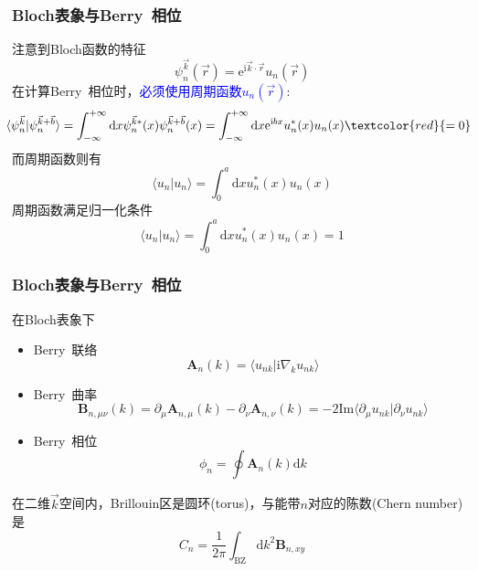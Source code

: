 {\frame
{
	\frametitle{\rm{Bloch}表象与\rm{Berry~}相位}
	注意到\textrm{Bloch}函数的特征
	\begin{displaymath}
		\psi_n^{\vec k}(\vec r)=\mathrm{e}^{\mathrm{i}\vec k\cdot\vec r}u_n(\vec r)
	\end{displaymath}
	在计算\textrm{Berry~}相位时，\textcolor{blue}{必须使用周期函数$u_n(\vec r)$}:
	\begin{displaymath}
		\hspace*{-5pt}
		\langle\psi_n^{\vec k}|\psi_n^{\vec k+\vec b}\rangle=\int_{-\infty}^{+\infty}\mathrm{d}x\psi_n^{\vec k\ast}(x)\psi_n^{\vec k+\vec b}(x)=\int_{-\infty}^{+\infty}\mathrm{d}x\mathrm{e}^{\mathrm{i}bx} u_n^{\ast}(x)u_n(x)\textcolor{red}{=0}
	\end{displaymath}
而周期函数则有
	\begin{displaymath}
		\langle u_n|u_n\rangle=\int_0^a\mathrm{d}x u_n^{\ast}(x)u_n(x)
	\end{displaymath}
周期函数满足归一化条件
	\begin{displaymath}
		\langle u_n|u_n\rangle=\int_0^a\mathrm{d}x u_n^{\ast}(x)u_n(x)=1
	\end{displaymath}
}

\frame
{
	\frametitle{\rm{Bloch}表象与\rm{Berry~}相位}
	在\textrm{Bloch}表象下
	\begin{itemize}
		\item \textrm{Berry~}联络	
	\begin{displaymath}
		\mathbf{A}_n(k)=\langle u_{nk}|\mathrm{i}\nabla_{k}u_{nk}\rangle
	\end{displaymath}
\item \textrm{Berry~}曲率
	\begin{displaymath}
		\mathbf{B}_{n,\mu\nu}(k)=\partial_{\mu}\mathbf{A}_{n,\mu}(k)-\partial_{\nu}\mathbf{A}_{n,\nu}(k)=-2\mathrm{Im}\langle\partial_{\mu}u_{nk}|\partial_{\nu}u_{nk}\rangle
	\end{displaymath}
\item \textrm{Berry~}相位
	\begin{displaymath}
		\phi_n=\oint\mathbf{A}_n(k)\mathrm{d}k
	\end{displaymath}
	\end{itemize}
	在二维$\vec k$空间内，\textrm{Brillouin}区是圆环\textrm{(torus)}，与能带$n$对应的陈数\textrm{(Chern number)}是
	\begin{displaymath}
		C_n=\dfrac1{2\pi}\int_{\mathrm{BZ}}\mathrm{d}k^2\mathbf{B}_{n,xy}
	\end{displaymath}
}

}
